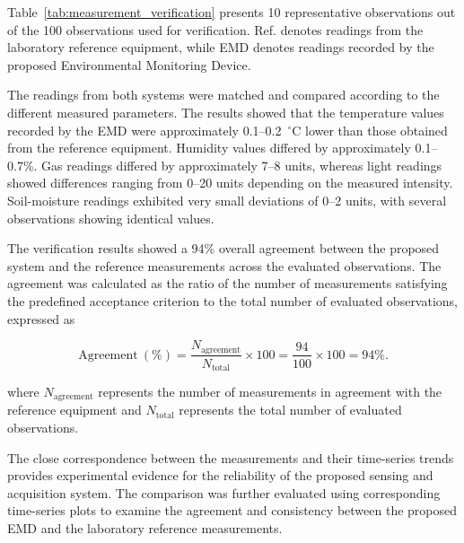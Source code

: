 ﻿\documentclass[journal]{IEEEtran}
\begin{document}
Table~\ref{tab:measurement_verification} presents 10 representative
observations out of the 100 observations used for verification. Ref. denotes
readings from the laboratory reference equipment, while EMD denotes readings
recorded by the proposed Environmental Monitoring Device.

The readings from both systems were matched and compared according to the
different measured parameters. The results showed that the temperature
values recorded by the EMD were approximately 0.1--0.2~$^\circ$C lower than
those obtained from the reference equipment. Humidity values differed by
approximately 0.1--0.7\%. Gas readings differed by approximately 7--8 units,
whereas light readings showed differences ranging from 0--20 units depending
on the measured intensity. Soil-moisture readings exhibited very small
deviations of 0--2 units, with several observations showing identical values.

The verification results showed a 94\% overall agreement between the proposed
system and the reference measurements across the evaluated observations.
The agreement was calculated as the ratio of the number of measurements
satisfying the predefined acceptance criterion to the total number of
evaluated observations, expressed as

\begin{equation}
    \mathrm{Agreement}~(\%) =
    \frac{N_{\mathrm{agreement}}}
    {N_{\mathrm{total}}}
    \times 100
    =
    \frac{94}{100}\times100
    =94\%.
    \label{eq:agreement}
\end{equation}

where $N_{\mathrm{agreement}}$ represents the number of measurements in
agreement with the reference equipment and $N_{\mathrm{total}}$ represents
the total number of evaluated observations.

The close correspondence between the measurements and their time-series
trends provides experimental evidence for the reliability of the proposed
sensing and acquisition system. The comparison was further evaluated using
corresponding time-series plots to examine the agreement and consistency
between the proposed EMD and the laboratory reference measurements.
\end{document}

